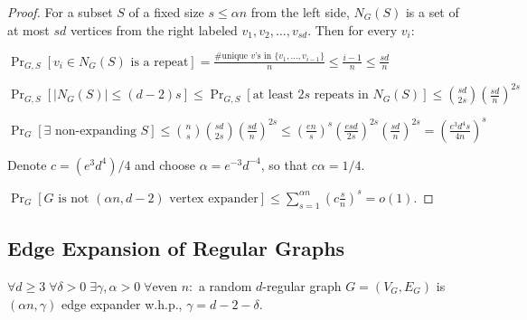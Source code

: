 \begin{proof}
    For a subset $S$ of a fixed size $s\leq\alpha n$ from the left side,
    $N_G(S)$ is a set of at most $sd$ vertices from the right labeled $v_1,v_2,\ldots,v_{sd}$.
    Then for every $v_i$:
    
    $\Pr_{G,S}[v_i\in N_G(S)\text{ is a repeat}]=\frac{\#\text{unique }v\text{'s in }\{v_1,\ldots,v_{i-1}\}}{n}
    \leq\frac{i-1}{n}\leq\frac{sd}{n}$
    
    $\Pr_{G,S}[|N_G(S)|\leq(d-2)s]\leq \Pr_{G,S}[\text{at least }2s\text{ repeats in }N_G(S)]
    \leq\binom{sd}{2s}\left(\frac{sd}{n}\right)^{2s}$
    
    $\Pr_G[\exists\text{ non-expanding }S]\leq\binom{n}{s}\binom{sd}{2s}\left(\frac{sd}{n}\right)^{2s}
    \leq\left(\frac{en}{s}\right)^s\left(\frac{esd}{2s}\right)^{2s}\left(\frac{sd}{n}\right)^{2s}
    =\left(\frac{e^3d^4s}{4n}\right)^s$
    
    Denote $c=(e^3d^4)/4$ and choose $\alpha=e^{-3}d^{-4}$, so that $c\alpha=1/4$.
    
    $\Pr_G[G\text{ is not }(\alpha n,d-2)\text{ vertex expander}]
    \leq\sum_{s=1}^{\alpha n}\left(c\frac{s}{n}\right)^{s}=o(1)$.
\end{proof}

\subsection{Edge Expansion of Regular Graphs}
\label{subsec:edge-expansion-reg}

\begin{theorem}
    \label{thm:reg-edge-expansion-optimal-gamma}
    $\forall d\geq3\;\forall\delta>0\;\exists\gamma,\alpha>0\;\forall\text{even }n:$
    a random $d$-regular graph $G=(V_G,E_G)$ is $(\alpha n,\gamma)$ edge expander w.h.p.,
    $\gamma=d-2-\delta$.
\end{theorem}

